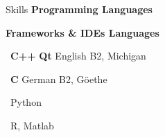 \documentclass{resume} %
\begin{document}
\begin{rSection}{Skills}
    \vspace*{1\baselineskip}
    \textbf{Programming Languages}
    \begin{center}
        \vspace*{-1.5\baselineskip}
        \textbf{\hspace{6cm} Frameworks & IDEs \hspace{3.8cm} Languages}
    \end{center}
    
    \newline
    \hspace{1.8cm} \textbullet \ \textbf{C++}  \hspace{5.7cm} \textbf{Qt}               \hspace{4.7cm} English B2, Michigan 
    
    \hspace{1.8cm} \textbullet \ \textbf{C}    \hspace{5.7cm}      \hspace{4cm} German B2,  Göethe 
    
    \hspace{1.8cm} \textbullet \ Python       \hspace{4.6cm}  
    
    \hspace{1.8cm} \textbullet \ R, Matlab
    
    \vspace*{1\baselin\baselineskip}
\end{rSection}
\end{document}
